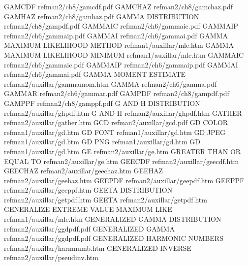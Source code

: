 GAMCDF                                  refman2/ch8/gamcdf.pdf
GAMCHAZ                                 refman2/ch8/gamchaz.pdf
GAMHAZ                                  refman2/ch8/gamhaz.pdf
GAMMA DISTRIBUTION                      refman2/ch8/gampdf.pdf
GAMMAIC                                 refman2/ch6/gammaic.pdf
GAMMAIP                                 refman2/ch6/gammaip.pdf
GAMMAI                                  refman2/ch6/gammai.pdf
GAMMA MAXIMUM LIKELIHOOD METHOD         refman1/auxillar/mle.htm
GAMMA MAXIMUM LIKELIHOOD MINIMUM        refman1/auxillar/mle.htm
GAMMAIC                                 refman2/ch6/gammaic.pdf
GAMMAIP                                 refman2/ch6/gammaip.pdf
GAMMAI                                  refman2/ch6/gammai.pdf
GAMMA MOMENT ESTIMATE                   refman2/auxillar/gammamom.htm
GAMMA                                   refman2/ch6/gamma.pdf
GAMMAR                                  refman2/ch6/gammar.pdf
GAMPDF                                  refman2/ch8/gampdf.pdf
GAMPPF                                  refman2/ch8/gamppf.pdf
G AND H DISTRIBUTION                    refman2/auxillar/ghpdf.htm
G AND H                                 refman2/auxillar/ghpdf.htm
GATHER                                  refman2/auxillar/gather.htm
GCD                                     refman2/auxillar/gcd.pdf
GD COLOR                                refman1/auxillar/gd.htm
GD FONT                                 refman1/auxillar/gd.htm
GD JPEG                                 refman1/auxillar/gd.htm
GD PNG                                  refman1/auxillar/gd.htm
GD                                      refman1/auxillar/gd.htm
GE                                      refman2/auxillar/ge.htm
GREATER THAN OR EQUAL TO                refman2/auxillar/ge.htm
GEECDF                                  refman2/auxillar/geecdf.htm
GEECHAZ                                 refman2/auxillar/geechaz.htm
GEEHAZ                                  refman2/auxillar/geehaz.htm
GEEPDF                                  refman2/auxillar/geepdf.htm
GEEPPF                                  refman2/auxillar/geeppf.htm
GEETA DISTRIBUTION                      refman2/auxillar/getpdf.htm
GEETA                                   refman2/auxillar/getpdf.htm
GENERALIZE EXTREME VALUE MAXIMUM LIKE   refman1/auxillar/mle.htm
GENERALIZED GAMMA DISTRIBUTION          refman2/auxillar/ggdpdf.pdf
GENERALIZED GAMMA                       refman2/auxillar/ggdpdf.pdf
GENERALIZED HARMONIC NUMBERS            refman2/auxillar/harmnumb.htm
GENERALIZED INVERSE                     refman2/auxillar/pseudinv.htm
